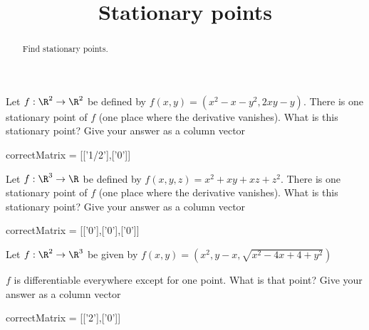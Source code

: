 \documentclass{ximera}
\title{Stationary points}
\begin{document}
	\begin{abstract}
		Find stationary points.
	\end{abstract}\maketitle
	
	\begin{question}
		Let $f:\R^2 \to \R^2$ be defined by $f(x,y) = (x^2-x-y^2,2xy-y) $.
		There is one stationary point of $f$ (one place where the derivative vanishes).  
		What is this stationary point?  Give your answer as a column vector
		 
		 \begin{matrix-answer}
		 correctMatrix = [['1/2'],['0']]
		 \end{matrix-answer}
	\end{question}
	\begin{question}
		Let $f:\R^3 \to \R$ be defined by $f(x,y,z) = x^2+xy+xz+z^2 $.
		There is one stationary point of $f$ (one place where the derivative vanishes).  
		What is this stationary point?  Give your answer as a column vector
		 
		 \begin{matrix-answer}
		 correctMatrix = [['0'],['0'],['0']]
		 \end{matrix-answer}
	\end{question}
	\begin{question}
		Let $f:\R^2 \to \R^3$ be given by $f(x,y) = (x^2,y-x,\sqrt{x^2-4x+4+y^2})$
		\begin{question}
			$f$ is differentiable everywhere except for one point.  What is that point?  Give your answer as a column vector
			\begin{matrix-answer}
			correctMatrix = [['2'],['0']]
			\end{matrix-answer}
		\end{question}
	\end{question}
\end{document}
